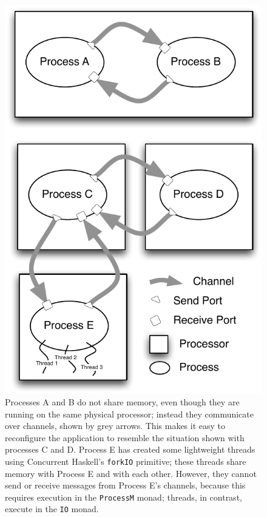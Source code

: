 \documentclass[preprint]{sigplanconf}
\begin{document}
\begin{figure}
\centerline {
\includegraphics[width=\columnwidth]{threadsAndProcesses}
}
\caption{ \label{fig:ProcessBubbles}
Processes A and B do not share memory, even though they are running on the same physical processor; instead they communicate over channels, shown by grey arrows.  This makes it easy to reconfigure the application to resemble the situation shown with processes C and D.  Process E has created some lightweight threads using Concurrent Haskell's \texttt{forkIO} primitive; these threads share memory with Process E and with each other.  However, they cannot send or receive messages from Process E's channels, because this requires execution in the \texttt{ProcessM} monad; threads, in contrast, execute in the \texttt{IO} monad.
}
\end{figure}
\end{document}
